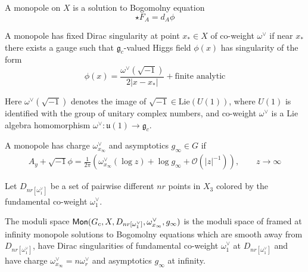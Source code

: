 \documentclass[12pt,psamsfonts,reqno]{amsart}
\begin{document}
\begin{definition}
A monopole on $X$ is a solution to Bogomolny equation
  \begin{equation}
    \star F_{A} = d_{A} \phi
  \end{equation}
\end{definition}


\begin{definition}
A monopole has fixed Dirac singularity at point $x_{*} \in X$ of co-weight $\omega^{\vee}$
  if near $x_*$ there exists a gauge such that $\mathfrak{g}_{c}$-valued Higgs field $\phi(x)$ has singularity
of the form
\begin{equation}
  \phi(x) = \frac{ \omega^{\vee} (\sqrt{-1})} { 2 |x - x_{*}|} + \text{finite analytic}
\end{equation}
\end{definition}

Here $\omega^{\vee}(\sqrt{-1})$ denotes the image of $\sqrt{-1} \in \mathrm{Lie}(U(1))$,
where $U(1)$ is identified with the group of unitary complex numbers,
and co-weight $\omega^{\vee}$ is a Lie algebra homomorphism $\omega^{\vee}: \mathfrak{u}(1) \to \mathfrak{g}_{c}$.

\begin{definition}
A  monopole
has charge $\omega^{\vee}_{x_\infty}$ and asymptotics $g_{\infty} \in G$ if 
\begin{equation}
  \begin{aligned}
   A_y  +  \sqrt{-1} \phi = \frac{1}{2\pi} \left( \omega^{\vee}_{x_{\infty}}( \log z)  + \log g_{\infty} + \mathcal{O}(|z|^{-1})  \right), \qquad z \to \infty
  \end{aligned}
\end{equation}
\end{definition}

Let $D_{nr[\omega_1^{\vee}]}$ be a set of pairwise different $nr$ points in $X_3$ 
colored by the fundamental co-weight $\omega^{\vee}_{1}$. 


\begin{definition}
The moduli space $\mathsf{Mon}(G_{c}, X, D_{nr[\omega_1^{\vee}]}, \omega_{x_\infty}^{\vee},  g_{\infty})$ is the moduli space of 
framed at infinity monopole solutions to Bogomolny equations which are smooth away from $D_{nr[\omega_1^{\vee}]}$, 
have Dirac singularities of fundamental co-weight $\omega_1^{\vee}$  at $D_{nr[\omega_1^{\vee}]}$
and have charge $\omega_{x_\infty}^{\vee} = n\omega_{r}^{\vee}$ and asymptotics $g_\infty$ at infinity. 
\end{definition}
\end{document}
